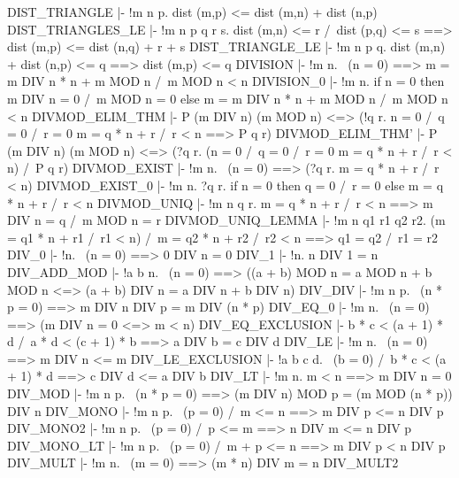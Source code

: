 \ENDTHEOREM
\THEOREM DIST\_TRIANGLE
  |- !m n p. dist (m,p) <= dist (m,n) + dist (n,p)
\ENDTHEOREM
\THEOREM DIST\_TRIANGLES\_LE
  |- !m n p q r s.
         dist (m,n) <= r /\ dist (p,q) <= s
         ==> dist (m,p) <= dist (n,q) + r + s
\ENDTHEOREM
\THEOREM DIST\_TRIANGLE\_LE
  |- !m n p q. dist (m,n) + dist (n,p) <= q ==> dist (m,p) <= q
\ENDTHEOREM
\THEOREM DIVISION
  |- !m n. ~(n = 0) ==> m = m DIV n * n + m MOD n /\ m MOD n < n
\ENDTHEOREM
\THEOREM DIVISION\_0
  |- !m n.
         if n = 0
         then m DIV n = 0 /\ m MOD n = 0
         else m = m DIV n * n + m MOD n /\ m MOD n < n
\ENDTHEOREM
\THEOREM DIVMOD\_ELIM\_THM
  |- P (m DIV n) (m MOD n) <=>
     (!q r. n = 0 /\ q = 0 /\ r = 0 \/ m = q * n + r /\ r < n ==> P q r)
\ENDTHEOREM
\THEOREM DIVMOD\_ELIM\_THM'
  |- P (m DIV n) (m MOD n) <=>
     (?q r. (n = 0 /\ q = 0 /\ r = 0 \/ m = q * n + r /\ r < n) /\ P q r)
\ENDTHEOREM
\THEOREM DIVMOD\_EXIST
  |- !m n. ~(n = 0) ==> (?q r. m = q * n + r /\ r < n)
\ENDTHEOREM
\THEOREM DIVMOD\_EXIST\_0
  |- !m n. ?q r. if n = 0 then q = 0 /\ r = 0 else m = q * n + r /\ r < n
\ENDTHEOREM
\THEOREM DIVMOD\_UNIQ
  |- !m n q r. m = q * n + r /\ r < n ==> m DIV n = q /\ m MOD n = r
\ENDTHEOREM
\THEOREM DIVMOD\_UNIQ\_LEMMA
  |- !m n q1 r1 q2 r2.
         (m = q1 * n + r1 /\ r1 < n) /\ m = q2 * n + r2 /\ r2 < n
         ==> q1 = q2 /\ r1 = r2
\ENDTHEOREM
\THEOREM DIV\_0
  |- !n. ~(n = 0) ==> 0 DIV n = 0
\ENDTHEOREM
\THEOREM DIV\_1
  |- !n. n DIV 1 = n
\ENDTHEOREM
\THEOREM DIV\_ADD\_MOD
  |- !a b n.
         ~(n = 0)
         ==> ((a + b) MOD n = a MOD n + b MOD n <=>
              (a + b) DIV n = a DIV n + b DIV n)
\ENDTHEOREM
\THEOREM DIV\_DIV
  |- !m n p. ~(n * p = 0) ==> m DIV n DIV p = m DIV (n * p)
\ENDTHEOREM
\THEOREM DIV\_EQ\_0
  |- !m n. ~(n = 0) ==> (m DIV n = 0 <=> m < n)
\ENDTHEOREM
\THEOREM DIV\_EQ\_EXCLUSION
  |- b * c < (a + 1) * d /\ a * d < (c + 1) * b ==> a DIV b = c DIV d
\ENDTHEOREM
\THEOREM DIV\_LE
  |- !m n. ~(n = 0) ==> m DIV n <= m
\ENDTHEOREM
\THEOREM DIV\_LE\_EXCLUSION
  |- !a b c d. ~(b = 0) /\ b * c < (a + 1) * d ==> c DIV d <= a DIV b
\ENDTHEOREM
\THEOREM DIV\_LT
  |- !m n. m < n ==> m DIV n = 0
\ENDTHEOREM
\THEOREM DIV\_MOD
  |- !m n p. ~(n * p = 0) ==> (m DIV n) MOD p = (m MOD (n * p)) DIV n
\ENDTHEOREM
\THEOREM DIV\_MONO
  |- !m n p. ~(p = 0) /\ m <= n ==> m DIV p <= n DIV p
\ENDTHEOREM
\THEOREM DIV\_MONO2
  |- !m n p. ~(p = 0) /\ p <= m ==> n DIV m <= n DIV p
\ENDTHEOREM
\THEOREM DIV\_MONO\_LT
  |- !m n p. ~(p = 0) /\ m + p <= n ==> m DIV p < n DIV p
\ENDTHEOREM
\THEOREM DIV\_MULT
  |- !m n. ~(m = 0) ==> (m * n) DIV m = n
\ENDTHEOREM
\THEOREM DIV\_MULT2
